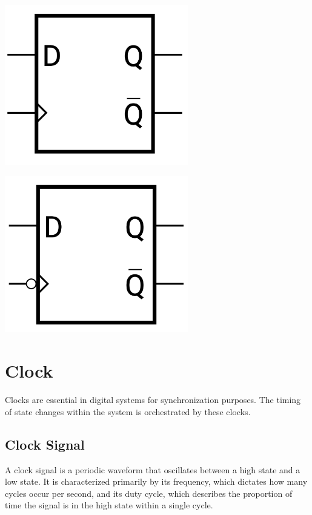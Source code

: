 \documentclass[12pt,openany]{book}
\begin{document}
\begin{minipage}{0.4\textwidth}
	\begin{center}
		\includegraphics[width=0.6\textwidth]{circuits/12.2.2.png}
	\end{center}
\end{minipage}
\hfill
\vline
\hfill
\begin{minipage}{0.4\textwidth}
	\begin{center}
		\includegraphics[width=0.6\textwidth]{circuits/12.2.2_2.png}
	\end{center}
\end{minipage}

\section{Clock}
Clocks are essential in digital systems for synchronization purposes. The timing of state changes within the system is orchestrated by these clocks.

\subsection{Clock Signal}
A clock signal is a periodic waveform that oscillates between a high state and a low state. It is characterized primarily by its frequency, which dictates how many cycles occur per second, and its duty cycle, which describes the proportion of time the signal is in the high state within a single cycle.
\end{document}
